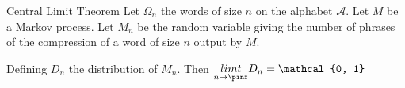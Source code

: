 \begin{theorem}{Central Limit Theorem}
    Let $\Omega_n$ the words of size $n$ on the 
    alphabet $\mathcal{A}$.
    Let $M$ be a Markov process.
    Let $M_n$ be the random variable giving the 
    number of phrases of the compression of a word
    of size $n$ output by $M$.

    Defining $D_n$ the distribution of $M_n$.
    Then $\underset{n\rightarrow\pinf}{limt} D_n = \mathcal{0, 1}$
\end{theorem}
    